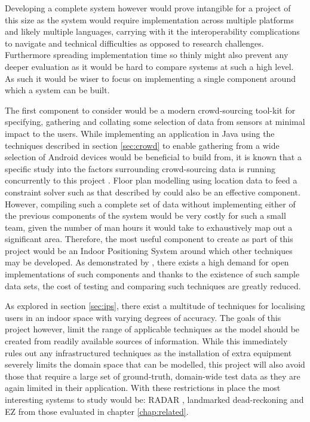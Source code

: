 \documentclass{UoYCSproject}
\begin{document}
        Developing a complete system however would prove intangible for a project of this size as the system would require implementation across multiple platforms and likely multiple languages, carrying with it the interoperability complications to navigate and technical difficulties as opposed to research challenges. Furthermore spreading implementation time so thinly might also prevent any deeper evaluation as it would be hard to compare systems at such a high level. As such it would be wiser to focus on implementing a single component around which a system can be built.
        
        The first component to consider would be a modern crowd-sourcing tool-kit for specifying, gathering and collating some selection of data from sensors at minimal impact to the users. While implementing an application in Java using the techniques described in section \ref{sec:crowd} to enable gathering from a wide selection of Android devices would be beneficial to build from, it is known that a specific study into the factors surrounding crowd-sourcing data is running concurrently to this project \citep{IainBate}. Floor plan modelling using location data to feed a constraint solver such as that described by \citet{charman1994constraint} could also be an effective component. However, compiling such a complete set of data without implementing either of the previous components of the system would be very costly for such a small team, given the number of man hours it would take to exhaustively map out a significant area. Therefore, the most useful component to create as part of this project would be an Indoor Positioning System around which other techniques may be developed. As demonstrated by \citet{torres2014ujiindoorloc}, there exists a high demand for open implementations of such components and thanks to the existence of such sample data sets, the cost of testing and comparing such techniques are greatly reduced.
        
        As explored in section \ref{sec:ips}, there exist a multitude of techniques for localising users in an indoor space with varying degrees of accuracy. The goals of this project however, limit the range of applicable techniques as the model should be created from readily available sources of information. While this immediately rules out any infrastructured techniques as the installation of extra equipment severely limits the domain space that can be modelled, this project will also avoid those that require a large set of ground-truth, domain-wide test data as they are again limited in their application. With these restrictions in place the most interesting systems to study would be: RADAR \citep{bahl2000radar}, landmarked dead-reckoning \citep{wang2012no} and EZ \citep{chintalapudi2010indoor} from those evaluated in chapter \ref{chap:related}.
        
\end{document}
